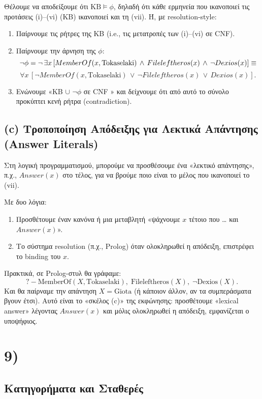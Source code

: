 \documentclass[a4paper,12pt]{article}
\begin{document}
Θέλουμε να αποδείξουμε ότι $\text{KB} \models \phi$, δηλαδή ότι κάθε ερμηνεία που ικανοποιεί τις προτάσεις (i)–(vi) (KB) ικανοποιεί και τη (vii). Ή, με resolution-style:
\begin{enumerate}
    \item Παίρνουμε τις ρήτρες της KB (i.e., τις μετατροπές των (i)–(vi) σε CNF).
    \item Παίρνουμε την άρνηση της $\phi$: 
    \[
    \neg\phi = \neg\,\exists x\,[MemberOf(x,\text{Tokaselaki})\,\wedge\,Fileleftheros(x)\,\wedge\,\neg Dexios(x)] \\ \equiv 
    \] 
    \[\forall x\,[\neg MemberOf(x,\text{Tokaselaki})\,\lor\,\neg Fileleftheros(x)\,\lor\,Dexios(x)].
    \]
    \item Ενώνουμε «KB $\cup$ { $\neg\phi$ σε CNF }» και δείχνουμε ότι από αυτό το σύνολο προκύπτει κενή ρήτρα (contradiction).
\end{enumerate}

\subsection*{(c) Τροποποίηση Απόδειξης για Λεκτικά Απάντησης (Answer Literals)}

Στη λογική προγραμματισμού, μπορούμε να προσθέσουμε ένα «λεκτικό απάντησης», π.χ., $Answer(x)$ στο τέλος, για να βρούμε ποιο είναι το μέλος που ικανοποιεί το (vii). 

Με δυο λόγια:
\begin{enumerate}
    \item Προσθέτουμε έναν κανόνα ή μια μεταβλητή «ψάχνουμε $x$ τέτοιο που … και $Answer(x)$».
    \item Το σύστημα resolution (π.χ., Prolog) όταν ολοκληρωθεί η απόδειξη, επιστρέφει το binding του $x$.
\end{enumerate}

Πρακτικά, σε Prolog-στυλ θα γράφαμε:
\[
?- \text{MemberOf}(X, \text{Tokaselaki}),\; \text{Fileleftheros}(X),\; \neg \text{Dexios}(X).
\]
Και θα παίρναμε την απάντηση $X = \text{Giota}$ (ή κάποιον άλλον, αν τα συμπεράσματα βγουν έτσι). Αυτό είναι το «σκέλος (c)» της εκφώνησης: προσθέτουμε «lexical answer» λέγοντας $Answer(x)$ και μόλις ολοκληρωθεί η απόδειξη, εμφανίζεται ο υποψήφιος.

\section*{9)}

\subsection*{Κατηγορήματα και Σταθερές}
\end{document}
